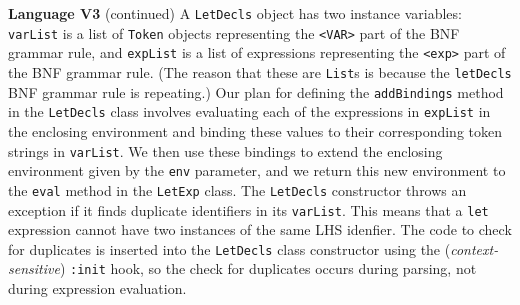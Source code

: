 \begin{minipage}[t]{\sw}
\slidenumber
\LARGE
{\bf Language V3} (continued)\exx
{\Large
\emm{}%
}\exx
A \verb'LetDecls' object
has two instance variables:
\verb'varList' is a list of \verb'Token' objects
representing the \verb'<VAR>' part of the BNF grammar rule,
and \verb'expList' is a list of expressions
representing the \verb'<exp>' part of the BNF grammar rule.
(The reason that these are \verb'List's is because
the \verb'letDecls' BNF grammar rule is repeating.)
Our plan for defining the \verb'addBindings' method
in the \verb'LetDecls' class
involves evaluating each of the expressions in \verb'expList'
in the enclosing environment and binding these values
to their corresponding token strings in \verb'varList'.
We then use these bindings to extend the enclosing environment
given by the \verb'env' parameter,
and we return this new environment to the \verb'eval' method
in the \verb'LetExp' class.\exx
The \verb'LetDecls' constructor throws an exception
if it finds duplicate identifiers in its \verb'varList'.
This means that a \verb'let' expression cannot have
two instances of the same LHS idenfier.
The code to check for duplicates is inserted
into the \verb'LetDecls' class constructor
using the ({\em context-sensitive}) \verb':init' hook,
so the check for duplicates occurs during parsing,
not during expression evaluation.
\end{minipage}
\clearpage
